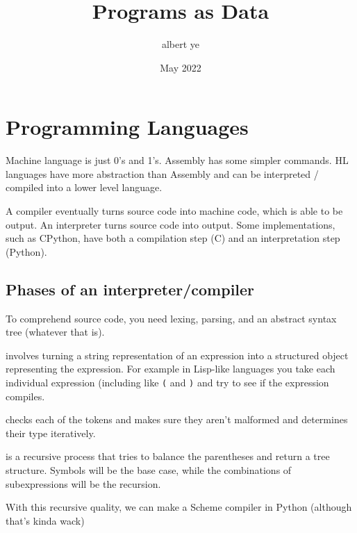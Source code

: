 \documentclass{scrartcl}
\title{Programs as Data}
\author{albert ye}
\date{May 2022}
\begin{document}
\maketitle

\section{Programming Languages}
Machine language is just 0's and 1's. Assembly has some simpler commands. HL languages have more abstraction
than Assembly and can be interpreted / compiled into a lower level language.

A compiler eventually turns source code into machine code, which is able to be output.
An interpreter turns source code into output. Some implementations, such as CPython, have both a compilation
step (C) and an interpretation step (Python).

\subsection{Phases of an interpreter/compiler}
To comprehend source code, you need lexing, parsing, and an abstract syntax tree (whatever that is).

 involves turning a string representation of an expression into a structured object representing the expression.
For example in Lisp-like languages you take each individual expression (including like \texttt{(} and \texttt{)} and try to see 
if the expression compiles.

 checks each of the tokens and makes sure they aren't malformed and determines their type iteratively.

 is a recursive process that tries to balance the parentheses and return a tree structure. Symbols will
be the base case, while the combinations of subexpressions will be the recursion.

With this recursive quality, we can make a Scheme compiler in Python (although that's kinda wack)
\end{document}
